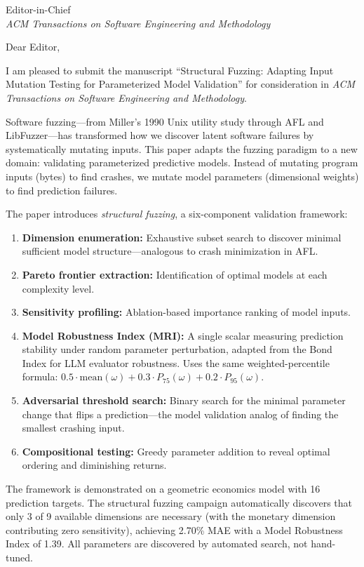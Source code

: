 \documentclass[12pt]{letter}
\begin{document}
\begin{letter}{%
Editor-in-Chief\\
\emph{ACM Transactions on Software Engineering and Methodology}}

\opening{Dear Editor,}

I am pleased to submit the manuscript ``Structural Fuzzing: Adapting Input Mutation Testing for Parameterized Model Validation'' for consideration in \emph{ACM Transactions on Software Engineering and Methodology}.

Software fuzzing---from Miller's 1990 Unix utility study through AFL and LibFuzzer---has transformed how we discover latent software failures by systematically mutating inputs.  This paper adapts the fuzzing paradigm to a new domain: validating parameterized predictive models.  Instead of mutating program inputs (bytes) to find crashes, we mutate model parameters (dimensional weights) to find prediction failures.

The paper introduces \emph{structural fuzzing}, a six-component validation framework:
\begin{enumerate}
    \item \textbf{Dimension enumeration:} Exhaustive subset search to discover minimal sufficient model structure---analogous to crash minimization in AFL.
    \item \textbf{Pareto frontier extraction:} Identification of optimal models at each complexity level.
    \item \textbf{Sensitivity profiling:} Ablation-based importance ranking of model inputs.
    \item \textbf{Model Robustness Index (MRI):} A single scalar measuring prediction stability under random parameter perturbation, adapted from the Bond Index for LLM evaluator robustness.  Uses the same weighted-percentile formula: $0.5 \cdot \mathrm{mean}(\omega) + 0.3 \cdot P_{75}(\omega) + 0.2 \cdot P_{95}(\omega)$.
    \item \textbf{Adversarial threshold search:} Binary search for the minimal parameter change that flips a prediction---the model validation analog of finding the smallest crashing input.
    \item \textbf{Compositional testing:} Greedy parameter addition to reveal optimal ordering and diminishing returns.
\end{enumerate}

The framework is demonstrated on a geometric economics model with 16 prediction targets.  The structural fuzzing campaign automatically discovers that only 3 of 9 available dimensions are necessary (with the monetary dimension contributing zero sensitivity), achieving 2.70\% MAE with a Model Robustness Index of 1.39.  All parameters are discovered by automated search, not hand-tuned.


\end{letter}
\end{document}
